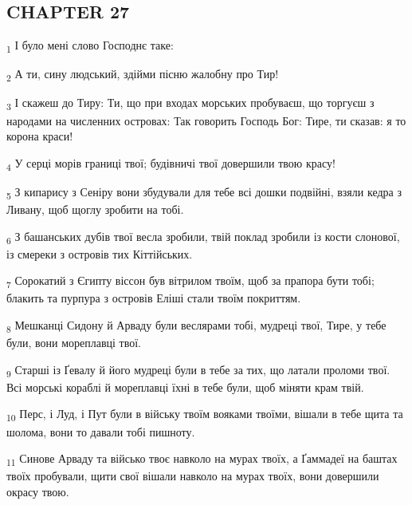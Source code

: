 \subsection{CHAPTER 27}
\begin{tcolorbox}
\textsubscript{1} І було мені слово Господнє таке:
\end{tcolorbox}
\begin{tcolorbox}
\textsubscript{2} А ти, сину людський, здійми пісню жалобну про Тир!
\end{tcolorbox}
\begin{tcolorbox}
\textsubscript{3} І скажеш до Тиру: Ти, що при входах морських пробуваєш, що торгуєш з народами на численних островах: Так говорить Господь Бог: Тире, ти сказав: я то корона краси!
\end{tcolorbox}
\begin{tcolorbox}
\textsubscript{4} У серці морів границі твої; будівничі твої довершили твою красу!
\end{tcolorbox}
\begin{tcolorbox}
\textsubscript{5} З кипарису з Сеніру вони збудували для тебе всі дошки подвійні, взяли кедра з Ливану, щоб щоглу зробити на тобі.
\end{tcolorbox}
\begin{tcolorbox}
\textsubscript{6} З башанських дубів твої весла зробили, твій поклад зробили із кости слонової, із смереки з островів тих Кіттійських.
\end{tcolorbox}
\begin{tcolorbox}
\textsubscript{7} Сорокатий з Єгипту віссон був вітрилом твоїм, щоб за прапора бути тобі; блакить та пурпура з островів Еліші стали твоїм покриттям.
\end{tcolorbox}
\begin{tcolorbox}
\textsubscript{8} Мешканці Сидону й Арваду були веслярами тобі, мудреці твої, Тире, у тебе були, вони мореплавці твої.
\end{tcolorbox}
\begin{tcolorbox}
\textsubscript{9} Старші із Ґевалу й його мудреці були в тебе за тих, що латали проломи твої. Всі морські кораблі й мореплавці їхні в тебе були, щоб міняти крам твій.
\end{tcolorbox}
\begin{tcolorbox}
\textsubscript{10} Перс, і Луд, і Пут були в війську твоїм вояками твоїми, вішали в тебе щита та шолома, вони то давали тобі пишноту.
\end{tcolorbox}
\begin{tcolorbox}
\textsubscript{11} Синове Арваду та військо твоє навколо на мурах твоїх, а Ґаммадеї на баштах твоїх пробували, щити свої вішали навколо на мурах твоїх, вони довершили окрасу твою.
\end{tcolorbox}
